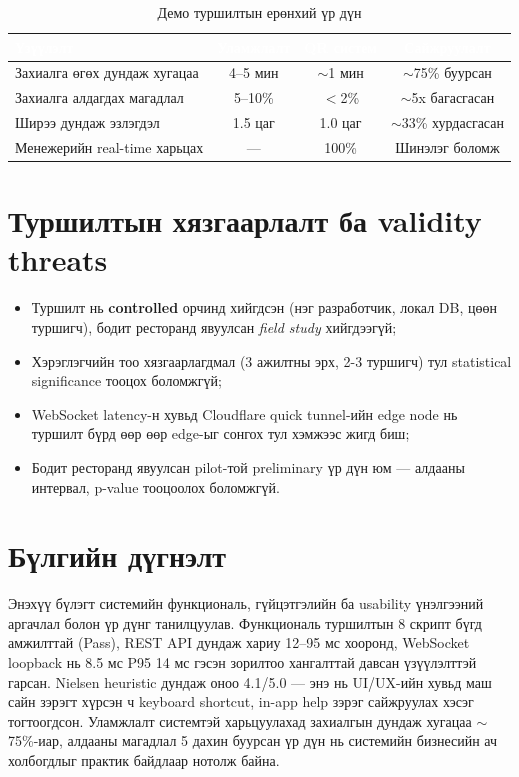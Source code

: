 \begin{table}[htbp]
\caption{Демо туршилтын ерөнхий үр дүн}
\label{tab:compare-final}
\centering
\begin{tabularx}{\textwidth}{|L|c|c|c|}
\hline
{}
\textcolor{white}{\textbf{Үзүүлэлт}} &
\textcolor{white}{\textbf{Уламжлалт}} &
\textcolor{white}{\textbf{QR систем}} &
\textcolor{white}{\textbf{Сайжруулалт}} \\ \hline
Захиалга өгөх дундаж хугацаа   & 4--5 мин & $\sim$1 мин & $\sim$75\% буурсан \\ \hline
{}
Захиалга алдагдах магадлал      & 5--10\%  & $<$2\%   & $\sim$5x багасгасан \\ \hline
Ширээ дундаж эзлэгдэл           & 1.5 цаг & 1.0 цаг & $\sim$33\% хурдасгасан \\ \hline
{}
Менежерийн real-time харьцах    & ---      & 100\%   & Шинэлэг боломж \\ \hline
\end{tabularx}
\end{table}

\section{Туршилтын хязгаарлалт ба validity threats}

\begin{itemize}[leftmargin=*]
  \item Туршилт нь \textbf{controlled} орчинд хийгдсэн (нэг разработчик,
        локал DB, цөөн туршигч), бодит ресторанд явуулсан \textit{field study}
        хийгдээгүй;
  \item Хэрэглэгчийн тоо хязгаарлагдмал (3 ажилтны эрх, 2-3 туршигч) тул
        statistical significance тооцох боломжгүй;
  \item WebSocket latency-н хувьд Cloudflare quick tunnel-ийн edge node нь
        туршилт бүрд өөр өөр edge-ыг сонгох тул хэмжээс жигд биш;
  \item Бодит ресторанд явуулсан pilot-той preliminary үр дүн юм — алдааны
        интервал, p-value тооцоолох боломжгүй.
\end{itemize}

\section{Бүлгийн дүгнэлт}

Энэхүү бүлэгт системийн функциональ, гүйцэтгэлийн ба usability үнэлгээний
аргачлал болон үр дүнг танилцуулав. Функциональ туршилтын 8 скрипт бүгд
амжилттай (Pass), REST API дундаж хариу 12--95 мс хооронд, WebSocket
loopback нь 8.5 мс P95 14 мс гэсэн зорилтоо хангалттай давсан үзүүлэлттэй
гарсан. Nielsen heuristic дундаж оноо 4.1/5.0 — энэ нь UI/UX-ийн хувьд маш
сайн зэрэгт хүрсэн ч keyboard shortcut, in-app help зэрэг сайжруулах хэсэг
тогтоогдсон. Уламжлалт системтэй харьцуулахад захиалгын дундаж хугацаа
$\sim$75\%-иар, алдааны магадлал 5 дахин буурсан үр дүн нь системийн
бизнесийн ач холбогдлыг практик байдлаар нотолж байна.
